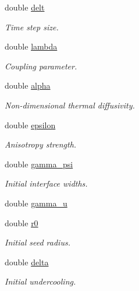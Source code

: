 \begin{DoxyCompactItemize}
double \hyperlink{classUintah_1_1PhaseField_1_1PureMetal_a244f4421efcb74abb18b6fc3db820f3c}{delt}
\begin{DoxyCompactList}\small\item\em Time step size. \end{DoxyCompactList}\item 
double \hyperlink{classUintah_1_1PhaseField_1_1PureMetal_ad6325f31d26471d2e9cb1f5329a76001}{lambda}
\begin{DoxyCompactList}\small\item\em Coupling parameter. \end{DoxyCompactList}\item 
double \hyperlink{classUintah_1_1PhaseField_1_1PureMetal_af93484419f003dadfc39fa2f322290f7}{alpha}
\begin{DoxyCompactList}\small\item\em Non-\/dimensional thermal diffusivity. \end{DoxyCompactList}\item 
double \hyperlink{classUintah_1_1PhaseField_1_1PureMetal_a85cfda14bf17e19996e45ff05b3d04d3}{epsilon}
\begin{DoxyCompactList}\small\item\em Anisotropy strength. \end{DoxyCompactList}\item 
double \hyperlink{classUintah_1_1PhaseField_1_1PureMetal_a97eb2b12020a360a5d448e15dee14186}{gamma\+\_\+psi}
\begin{DoxyCompactList}\small\item\em Initial interface widths. \end{DoxyCompactList}\item 
double \hyperlink{classUintah_1_1PhaseField_1_1PureMetal_a0cdb400615b91186309627f6dd2c7f95}{gamma\+\_\+u}
\item 
double \hyperlink{classUintah_1_1PhaseField_1_1PureMetal_ad3ef1c4a83946912d066e2e100657b62}{r0}
\begin{DoxyCompactList}\small\item\em Initial seed radius. \end{DoxyCompactList}\item 
double \hyperlink{classUintah_1_1PhaseField_1_1PureMetal_a36639bdedb3da620d4e0d3bc760ab0be}{delta}
\begin{DoxyCompactList}\small\item\em Initial undercooling. \end{DoxyCompactList}\item 

\end{DoxyCompactItemize}
